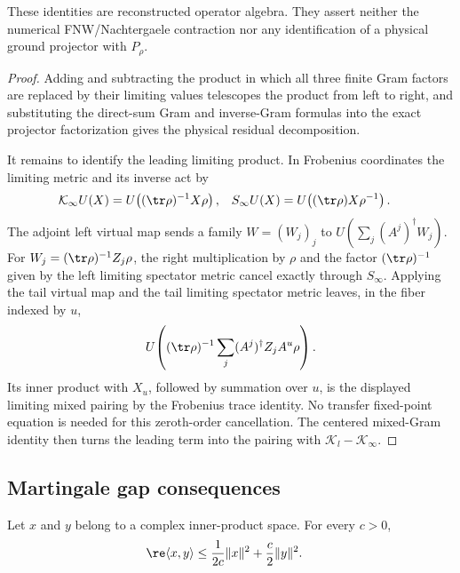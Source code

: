 \begin{lemma}
    These identities are reconstructed operator algebra.  They assert neither
    the numerical FNW/Nachtergaele contraction nor any identification of a
    physical ground projector with $P_\rho$.
\end{lemma}
\begin{proof}
    \leanok
    Adding and subtracting the product in which all three finite Gram factors
    are replaced by their limiting values telescopes the product from left to
    right, and substituting the direct-sum Gram and inverse-Gram formulas into
    the exact projector factorization gives the physical residual decomposition.

    It remains to identify the leading limiting product.  In Frobenius
    coordinates the limiting metric and its inverse act by
    \begin{align}
        \mathcal K_\infty U(X)
         & =U\!\left((\tr\rho)^{-1}X\rho\right), &
        S_\infty U(X)
         & =U\!\left((\tr\rho)X\rho^{-1}\right).
    \end{align}
    The adjoint left virtual map sends a family $W=(W_j)_j$ to
    $U(\sum_j(A^j)^\dagger W_j)$.  For
    $W_j=(\tr\rho)^{-1}Z_j\rho$, the right multiplication by $\rho$ and
    the factor $(\tr\rho)^{-1}$ given by the left limiting spectator
    metric cancel exactly through $S_\infty$.  Applying the tail virtual map and the
    tail limiting spectator metric leaves, in the fiber indexed by $u$,
    \begin{align}
        U\!\left((\tr\rho)^{-1}
        \sum_j (A^j)^\dagger Z_jA^u\rho\right).
    \end{align}
    Its inner product with $X_u$, followed by summation over $u$, is the
    displayed limiting mixed pairing by the Frobenius trace identity.  No
    transfer fixed-point equation is needed for this zeroth-order
    cancellation.  The centered mixed-Gram identity then turns the leading
    term into the pairing with $\mathcal K_l-\mathcal K_\infty$.
\end{proof}

\subsection{Martingale gap consequences}\label{subsec:spectral_gap_martingale}

\begin{lemma}
    \label{lem:nachtergaele_weighted_inner_product}
    \leanok
    Let $x$ and $y$ belong to a complex inner-product space. For every $c>0$,
    \begin{align}
        \re\langle x,y\rangle
         & \leq \frac{1}{2c}\lVert x\rVert^2
        +\frac{c}{2}\lVert y\rVert^2.
        \label{eq:nachtergaele_weighted_inner_product}
    \end{align}
\end{lemma}

